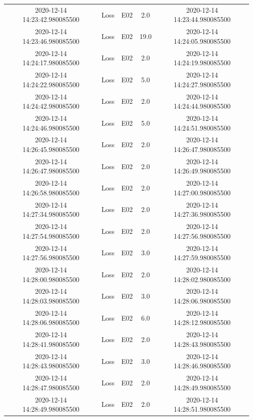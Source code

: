 \begin{enumerate}
\begin{longtabu}{ccccc}
2020{-}12{-}14 14:23:42.980085500&Loss&E02&2.0&2020{-}12{-}14 14:23:44.980085500\\%
2020{-}12{-}14 14:23:46.980085500&Loss&E02&19.0&2020{-}12{-}14 14:24:05.980085500\\%
2020{-}12{-}14 14:24:17.980085500&Loss&E02&2.0&2020{-}12{-}14 14:24:19.980085500\\%
2020{-}12{-}14 14:24:22.980085500&Loss&E02&5.0&2020{-}12{-}14 14:24:27.980085500\\%
2020{-}12{-}14 14:24:42.980085500&Loss&E02&2.0&2020{-}12{-}14 14:24:44.980085500\\%
2020{-}12{-}14 14:24:46.980085500&Loss&E02&5.0&2020{-}12{-}14 14:24:51.980085500\\%
2020{-}12{-}14 14:26:45.980085500&Loss&E02&2.0&2020{-}12{-}14 14:26:47.980085500\\%
2020{-}12{-}14 14:26:47.980085500&Loss&E02&2.0&2020{-}12{-}14 14:26:49.980085500\\%
2020{-}12{-}14 14:26:58.980085500&Loss&E02&2.0&2020{-}12{-}14 14:27:00.980085500\\%
2020{-}12{-}14 14:27:34.980085500&Loss&E02&2.0&2020{-}12{-}14 14:27:36.980085500\\%
2020{-}12{-}14 14:27:54.980085500&Loss&E02&2.0&2020{-}12{-}14 14:27:56.980085500\\%
2020{-}12{-}14 14:27:56.980085500&Loss&E02&3.0&2020{-}12{-}14 14:27:59.980085500\\%
2020{-}12{-}14 14:28:00.980085500&Loss&E02&2.0&2020{-}12{-}14 14:28:02.980085500\\%
2020{-}12{-}14 14:28:03.980085500&Loss&E02&3.0&2020{-}12{-}14 14:28:06.980085500\\%
2020{-}12{-}14 14:28:06.980085500&Loss&E02&6.0&2020{-}12{-}14 14:28:12.980085500\\%
2020{-}12{-}14 14:28:41.980085500&Loss&E02&2.0&2020{-}12{-}14 14:28:43.980085500\\%
2020{-}12{-}14 14:28:43.980085500&Loss&E02&3.0&2020{-}12{-}14 14:28:46.980085500\\%
2020{-}12{-}14 14:28:47.980085500&Loss&E02&2.0&2020{-}12{-}14 14:28:49.980085500\\%
2020{-}12{-}14 14:28:49.980085500&Loss&E02&2.0&2020{-}12{-}14 14:28:51.980085500\\%
\hline%
\end{longtabu}%



\end{enumerate}
